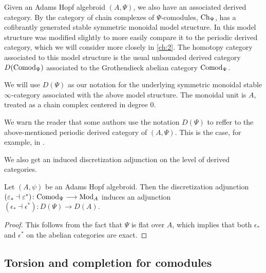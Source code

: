 Given an Adams Hopf algebroid $(A, \Psi)$, we also have an associated derived category. By \cite[2.1.2, 2.1.3]{hovey_04} the category of chain complexes of $\Psi$-comodules, $\mathrm{Ch}_\Psi$, has a cofibrantly generated stable symmetric monoidal model structure. In \cite{barnes-roitzheim_2011} this model structure was modified slightly to more easily compare it to the periodic derived category, which we will consider more closely in \cref{ch:2}. The homotopy category associated to this model structure is the usual unbounded derived category $D(\mathrm{Comod}_\Psi)$ associated to the Grothendieck abelian category $\mathrm{Comod}_\Psi$. 
 

\begin{notation}
    We will use $D(\Psi)$ as our notation for the underlying symmetric monoidal stable $\infty$-category associated with the above model structure. The monoidal unit is $A$, treated as a chain complex centered in degree $0$.
\end{notation}

\begin{remark}
    We warn the reader that some authors use the notation $D(\Psi)$ to reffer to the above-mentioned periodic derived category of $(A, \Psi)$. This is the case, for example, in \cite{pstragowski_2021}. 
\end{remark}

We also get an induced discretization adjunction on the level of derived categories. 

\begin{proposition}
    Let $(A,\psi)$ be an Adams Hopf algebroid. Then the discretization adjunction $(\varepsilon_*\dashv \varepsilon^*)\colon \mathrm{Comod}_\Psi\longrightarrow \mathrm{Mod}_A$ induces an adjunction $(\epsilon_*\dashv \epsilon^*)\colon D(\Psi)\longrightarrow D(A).$
\end{proposition}
\begin{proof}
    This follows from the fact that $\Psi$ is flat over $A$, which implies that both $\epsilon_*$ and $\epsilon^*$ on the abelian categories are exact. 
\end{proof}






\subsection{Torsion and completion for comodules}
\label{ssec:torsion-and-completion-for-comodules}

